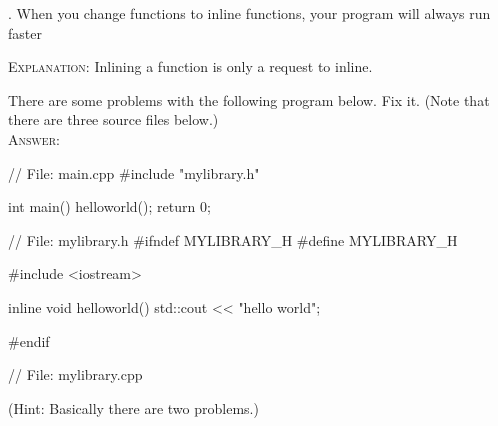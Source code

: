 

\renewcommand\AUTHOR{jdoe5@cougars.ccis.edu} %


\topmattertwo


\nextq
\tf. When you change functions to inline functions, your
program will always run faster
\dotfill{}

\textsc{Explanation:}
Inlining a function is only a request to inline.

\nextq
There are some problems with the following program below.
Fix it.
(Note that there are three source files below.)
\\
\textsc{Answer:}\vspace{-2mm}
\begin{answercode}
// File: main.cpp
#include "mylibrary.h"

int main()
{
    helloworld();
    return 0;
}
\end{answercode}
\begin{answercode}
// File: mylibrary.h
#ifndef MYLIBRARY_H
#define MYLIBRARY_H

#include <iostream>

inline void helloworld()
{
    std::cout << "hello world\n";
}

#endif
\end{answercode}
\begin{answercode}
// File: mylibrary.cpp
\end{answercode}
\vspace{-3mm}
(Hint: Basically there are two problems.)

\newpage

